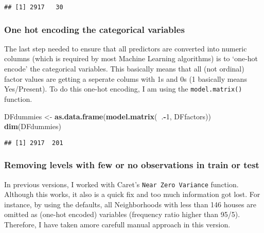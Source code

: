 \documentclass[]{article}
\newenvironment{Shaded}{\begin{snugshade}}{\end{snugshade}}
\newcommand{\KeywordTok}[1]{\textcolor[rgb]{0.13,0.29,0.53}{\textbf{#1}}}
\newcommand{\DecValTok}[1]{\textcolor[rgb]{0.00,0.00,0.81}{#1}}
\newcommand{\StringTok}[1]{\textcolor[rgb]{0.31,0.60,0.02}{#1}}
\newcommand{\CommentTok}[1]{\textcolor[rgb]{0.56,0.35,0.01}{\textit{#1}}}
\newcommand{\OperatorTok}[1]{\textcolor[rgb]{0.81,0.36,0.00}{\textbf{#1}}}
\newcommand{\NormalTok}[1]{#1}
\begin{document}
\begin{verbatim}
## [1] 2917   30
\end{verbatim}

\subsubsection{One hot encoding the categorical
variables}\label{one-hot-encoding-the-categorical-variables}

The last step needed to ensure that all predictors are converted into
numeric columns (which is required by most Machine Learning algorithms)
is to `one-hot encode' the categorical variables. This basically means
that all (not ordinal) factor values are getting a seperate colums with
1s and 0s (1 basically means Yes/Present). To do this one-hot encoding,
I am using the \texttt{model.matrix()} function.

\begin{Shaded}
\begin{Highlighting}[]
\NormalTok{DFdummies <-}\StringTok{ }\KeywordTok{as.data.frame}\NormalTok{(}\KeywordTok{model.matrix}\NormalTok{(}\OperatorTok{~}\NormalTok{.}\OperatorTok{-}\DecValTok{1}\NormalTok{, DFfactors))}
\KeywordTok{dim}\NormalTok{(DFdummies)}
\end{Highlighting}
\end{Shaded}

\begin{verbatim}
## [1] 2917  201
\end{verbatim}

\subsubsection{Removing levels with few or no observations in train or
test}\label{removing-levels-with-few-or-no-observations-in-train-or-test}

In previous versions, I worked with Caret's
\texttt{Near\ Zero\ Variance} function. Although this works, it also is
a quick fix and too much information got lost. For instance, by using
the defaults, all Neighborhoods with less than 146 houses are omitted as
(one-hot encoded) variables (frequency ratio higher than 95/5).
Therefore, I have taken amore carefull manual approach in this version.

\begin{Shaded}
\end{Shaded}
\end{document}
